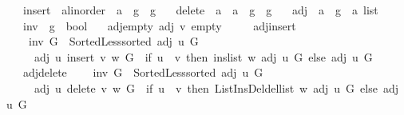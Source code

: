 \begin{isabellebody}
\ \ \ insert\ {\isacharcolon}{\kern0pt}{\isacharcolon}{\kern0pt}\ {\isachardoublequoteopen}{\isacharprime}{\kern0pt}a{\isacharcolon}{\kern0pt}{\isacharcolon}{\kern0pt}linorder\ {\isasymRightarrow}\ {\isacharprime}{\kern0pt}a\ {\isasymRightarrow}\ {\isacharprime}{\kern0pt}g\ {\isasymRightarrow}\ {\isacharprime}{\kern0pt}g{\isachardoublequoteclose}\isanewline
\ \ \ delete\ {\isacharcolon}{\kern0pt}{\isacharcolon}{\kern0pt}\ {\isachardoublequoteopen}{\isacharprime}{\kern0pt}a\ {\isasymRightarrow}\ {\isacharprime}{\kern0pt}a\ {\isasymRightarrow}\ {\isacharprime}{\kern0pt}g\ {\isasymRightarrow}\ {\isacharprime}{\kern0pt}g{\isachardoublequoteclose}\isanewline
\ \ \ adj\ {\isacharcolon}{\kern0pt}{\isacharcolon}{\kern0pt}\ {\isachardoublequoteopen}{\isacharprime}{\kern0pt}a\ {\isasymRightarrow}\ {\isacharprime}{\kern0pt}g\ {\isasymRightarrow}\ {\isacharprime}{\kern0pt}a\ list{\isachardoublequoteclose}\isanewline
\ \ \ inv\ {\isacharcolon}{\kern0pt}{\isacharcolon}{\kern0pt}\ {\isachardoublequoteopen}{\isacharprime}{\kern0pt}g\ {\isasymRightarrow}\ bool{\isachardoublequoteclose}\isanewline
\ \ \ adj{\isacharunderscore}{\kern0pt}empty{\isacharcolon}{\kern0pt}\ {\isachardoublequoteopen}adj\ v\ empty\ {\isacharequal}{\kern0pt}\ {\isacharbrackleft}{\kern0pt}{\isacharbrackright}{\kern0pt}{\isachardoublequoteclose}\isanewline
\ \ \ adj{\isacharunderscore}{\kern0pt}insert{\isacharcolon}{\kern0pt}\isanewline
\ \ \ \ {\isachardoublequoteopen}inv\ G\ {\isasymand}\ Sorted{\isacharunderscore}{\kern0pt}Less{\isachardot}{\kern0pt}sorted\ {\isacharparenleft}{\kern0pt}adj\ u\ G{\isacharparenright}{\kern0pt}\ {\isasymLongrightarrow}\isanewline
\ \ \ \ \ adj\ u\ {\isacharparenleft}{\kern0pt}insert\ v\ w\ G{\isacharparenright}{\kern0pt}\ {\isacharequal}{\kern0pt}\ {\isacharparenleft}{\kern0pt}if\ u\ {\isacharequal}{\kern0pt}\ v\ then\ ins{\isacharunderscore}{\kern0pt}list\ w\ {\isacharparenleft}{\kern0pt}adj\ u\ G{\isacharparenright}{\kern0pt}\ else\ adj\ u\ G{\isacharparenright}{\kern0pt}{\isachardoublequoteclose}\isanewline
\ \ \ adj{\isacharunderscore}{\kern0pt}delete{\isacharcolon}{\kern0pt}\isanewline
\ \ \ \ {\isachardoublequoteopen}inv\ G\ {\isasymand}\ Sorted{\isacharunderscore}{\kern0pt}Less{\isachardot}{\kern0pt}sorted\ {\isacharparenleft}{\kern0pt}adj\ u\ G{\isacharparenright}{\kern0pt}\ {\isasymLongrightarrow}\isanewline
\ \ \ \ \ adj\ u\ {\isacharparenleft}{\kern0pt}delete\ v\ w\ G{\isacharparenright}{\kern0pt}\ {\isacharequal}{\kern0pt}\ {\isacharparenleft}{\kern0pt}if\ u\ {\isacharequal}{\kern0pt}\ v\ then\ List{\isacharunderscore}{\kern0pt}Ins{\isacharunderscore}{\kern0pt}Del{\isachardot}{\kern0pt}del{\isacharunderscore}{\kern0pt}list\ w\ {\isacharparenleft}{\kern0pt}adj\ u\ G{\isacharparenright}{\kern0pt}\ else\ adj\ u\ G{\isacharparenright}{\kern0pt}{\isachardoublequoteclose}\isanewline

\end{isabellebody}

